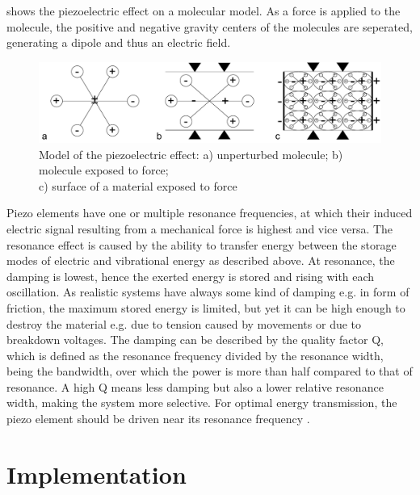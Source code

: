 \documentclass[
	english,
	ruledheaders=section, %
	class=report,%
	thesis={type=Project Seminar Report},%
	accentcolor=TUDa-1d, %
	custommargins=false,%
	marginpar=false,%
	parskip=half-,%
	fontsize=11pt,%
]{tudapub}
\begin{document}
 shows the piezoelectric effect on a molecular model. As a force is applied to the molecule, the positive and negative gravity centers of the molecules are seperated, generating a dipole and thus an electric field.
\begin{figure}[H]
    \centering
    \includegraphics[width=\columnwidth]{drawings/piezoelectric_effect.pdf}
    \caption{Model of the piezoelectric effect: a) unperturbed molecule; b) molecule exposed to force; \\c) surface of a material exposed to force}
    \label{drw:piezo_effect}
\end{figure}

Piezo elements have one or multiple resonance frequencies, at which their induced electric signal resulting from a mechanical force is highest and vice versa. The resonance effect is caused by the ability to transfer energy between the storage modes of electric and vibrational energy as described above. At resonance, the damping is lowest, hence the exerted energy is stored and rising with each oscillation. As realistic systems have always some kind of damping e.g. in form of friction, the maximum stored energy is limited, but yet it can be high enough to destroy the material e.g. due to tension caused by movements or due to breakdown voltages. The damping can be described by the quality factor Q, which is defined  as the resonance frequency divided by the resonance width, being the bandwidth, over which the power is more than half compared to that of resonance. A high Q means less damping but also a lower relative resonance width, making the system more selective. For optimal energy transmission, the piezo element should be driven near its resonance frequency \autocite{arnauFundamentalsPiezoelectricity2008,lucklumModelsResonantSensors2008}.

\chapter{Implementation}\label{chap:impl}
\end{document}

